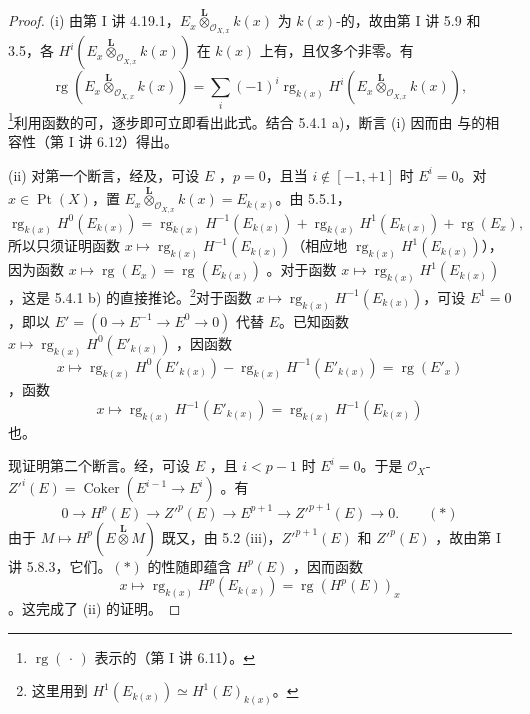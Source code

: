 \begin{proof}
(i) 由第 I 讲 4.19.1，$E_x\mathbin{\overset{\mathbf L}{\otimes}}_{\mathcal O_{X,x}}k(x)$ 为 $k(x)$-的，故由第 I 讲 5.9 和 3.5，各 $H^i(E_x\mathbin{\overset{\mathbf L}{\otimes}}_{\mathcal O_{X,x}}k(x))$ 在 $k(x)$ 上有，且仅多个非零。有
\[
\operatorname{rg}(E_x\mathbin{\overset{\mathbf L}{\otimes}}_{\mathcal O_{X,x}}k(x))
=\sum_i(-1)^i\operatorname{rg}_{k(x)}H^i(E_x\mathbin{\overset{\mathbf L}{\otimes}}_{\mathcal O_{X,x}}k(x)),\tag{5.5.1}
\]
\footnote{$\operatorname{rg}(\,\cdot\,)$ 表示的（第 I 讲 6.11）。}利用函数的可，逐步即可立即看出此式。结合 5.4.1 a)，断言 (i) 因而由
与的相容性（第 I 讲 6.12）得出。

(ii) 对第一个断言，经及，可设 $E$ ，$p=0$，且当 $i\notin[-1,+1]$ 时 $E^i=0$。对 $x\in\operatorname{Pt}(X)$，置 $E_x\mathbin{\overset{\mathbf L}{\otimes}}_{\mathcal O_{X,x}}k(x)=E_{k(x)}$。由 5.5.1，
\[
\operatorname{rg}_{k(x)}H^0(E_{k(x)})
=\operatorname{rg}_{k(x)}H^{-1}(E_{k(x)})
+\operatorname{rg}_{k(x)}H^1(E_{k(x)})+\operatorname{rg}(E_x),
\]
所以只须证明函数 $x\mapsto\operatorname{rg}_{k(x)}H^{-1}(E_{k(x)})$（相应地 $\operatorname{rg}_{k(x)}H^1(E_{k(x)})$），因为函数 $x\mapsto\operatorname{rg}(E_x)=\operatorname{rg}(E_{k(x)})$ 。对于函数 $x\mapsto\operatorname{rg}_{k(x)}H^1(E_{k(x)})$，这是 5.4.1 b) 的直接推论。\footnote{这里用到 $H^1(E_{k(x)})\simeq H^1(E)_{k(x)}$。}对于函数 $x\mapsto\operatorname{rg}_{k(x)}H^{-1}(E_{k(x)})$，可设 $E^1=0$，即以 $E'=(0\to E^{-1}\to E^0\to0)$ 代替 $E$。已知函数 $x\mapsto\operatorname{rg}_{k(x)}H^0(E'_{k(x)})$ ，因函数
\[
x\longmapsto\operatorname{rg}_{k(x)}H^0(E'_{k(x)})-
\operatorname{rg}_{k(x)}H^{-1}(E'_{k(x)})=\operatorname{rg}(E'_x)
\]
，函数
\[
x\longmapsto\operatorname{rg}_{k(x)}H^{-1}(E'_{k(x)})=
\operatorname{rg}_{k(x)}H^{-1}(E_{k(x)})
\]
也。

现证明第二个断言。经，可设 $E$ ，且 $i<p-1$ 时 $E^i=0$。于是 $\mathcal O_X$- $Z'^i(E)=\operatorname{Coker}(E^{i-1}\to E^i)$ 。有
\[
0\longrightarrow H^p(E)\longrightarrow Z'^p(E)\longrightarrow E^{p+1}\longrightarrow Z'^{p+1}(E)\longrightarrow0.\qquad(*)
\]
由于 $M\mapsto H^p(E\mathbin{\overset{\mathbf L}{\otimes}}M)$ 既又，由 5.2 (iii)，$Z'^{p+1}(E)$ 和 $Z'^p(E)$ ，故由第 I 讲 5.8.3，它们。$(*)$ 的性随即蕴含 $H^p(E)$ ，因而函数
\[
x\longmapsto\operatorname{rg}_{k(x)}H^p(E_{k(x)})=\operatorname{rg}(H^p(E))_x
\]
。这完成了 (ii) 的证明。


\end{proof}

